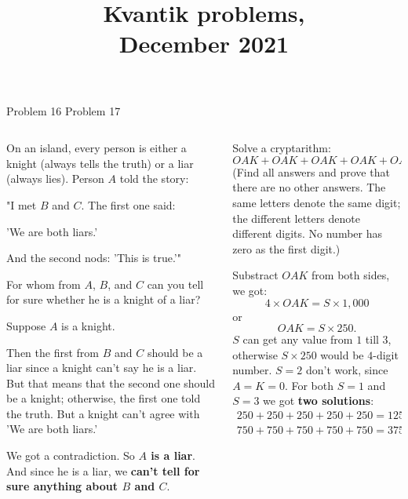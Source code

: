 \documentclass[9pt,aspectratio=169]{beamer}
\title{Kvantik problems,\\ December 2021}
\begin{document}
\maketitle

\begin{frame}{Problem 16 \hspace*{5cm} Problem 17}
  \begin{columns}[T]
    \begin{column}{0.5\textwidth}
      \begin{problem}
        On an island, every person is either a knight (always tells the truth) or a liar (always lies). Person $A$ told the story:

        "I met $B$ and $C$. The first one said: 

        'We are both liars.' 

        And the second nods: 'This is true.'"

        For whom from $A$, $B$, and $C$ can you tell for sure whether he is a knight of a liar? 
      \end{problem}

      Suppose $A$ is a knight. 
      
      Then the first from $B$ and $C$ should be a liar since a knight can't say he is a liar. But that means that the second one should be a knight; otherwise, the first one told the truth. But a knight can't agree with 'We are both liars.'

      We got a contradiction. So \textbf{$A$ is a liar}. And since he is a liar, we \textbf{can't tell for sure anything about $B$ and $C$}.
    \end{column}
    \begin{column}{0.5\textwidth}
      \begin{problem}
        Solve a cryptarithm:
        \[ OAK + OAK + OAK + OAK + OAK = SOAK.\]
        (Find all answers and prove that there are no other answers. The same letters denote the same digit; the different letters denote different digits. No number has zero as the first digit.)
      \end{problem}

      Substract $OAK$ from both sides, we got:
      \[ 4 \times OAK = S \times 1{,}000 \]
      or 
      \[ OAK = S \times 250. \]
      $S$ can get any value from $1$ till $3$, otherwise $S \times 250$ would be $4$-digit number. $S=2$ don't work, since $A = K = 0.$ For both $S = 1$ and $S = 3$ we got \textbf{two solutions}:
      \begin{gather*}
        250 + 250 + 250 + 250 + 250 = 1250, \\
        750 + 750 + 750 + 750 + 750 = 3750.
      \end{gather*} 
    \end{column}
  \end{columns}
\end{frame}
\end{document}

